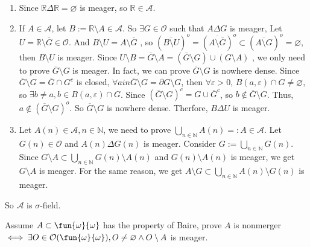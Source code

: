 \documentclass{ctexart}
\begin{document}
\begin{solution}
  \begin{enumerate}
    \item Since \(\mathbb{R} \Delta \mathbb{R} = \varnothing\) is meager, so \(\mathbb{R} \in \mathcal{A}\). 
    \item  If \(A \in \mathcal{A}\), let \(B:=\mathbb{R} \setminus A \in \mathcal{A}\). 
      So \( \exists G \in \mathcal{O}\) such that \( A \Delta G\) is meager,  
      Let \(U=\mathbb{R} \setminus \overline{G} \in \mathcal{O}\). And \(B \setminus U = A \setminus \overline{G}\)
      , so \((\overline{B \setminus U })^o = (\overline{A \setminus \overline{G}})^o  \subset (\overline{A \setminus G})^
      o = \varnothing\), then \(B \setminus U\) is meager. 
      Since \(U \setminus B = \overline{ G}\setminus A = (\overline{G} \setminus G) \cup (G \setminus A)\)
      , we only need to prove \(\overline{G}\setminus G\) is meager. 
      In fact, we can prove \(\overline{G}\setminus G\) is nowhere dense. 
      Since \(\overline{G} \setminus G = \overline{G} \cap G^c \) is closed,
       \(\forall a in \overline{G} \setminus G = \partial G \setminus G\), then \(\forall \varepsilon > 0\),
     \(B(a,\varepsilon) \cap G \neq \varnothing\), so \(\exists b \neq a, b \in B(a, \varepsilon) \cap G \).
     Since \((\overline{G} \setminus G)^c = G \cup \overline{G}^c\), so \(b \notin \overline{G} \setminus G\).
     Thus, \(a \notin (\overline{G} \setminus G)^o\).
     So \(\overline{G} \setminus G\) is nowhere dense. Therfore, \(B \Delta U\) is meager. 
    \item Let \(A(n) \in \mathcal{A}, n \in \mathbb{N}\), we need to prove \(\bigcup_{n \in \mathbb{N}} A(n)=:A \in \mathcal{A}\). 
     Let \(G(n) \in \mathcal{O}\) and \(A(n) \Delta G(n)\) is meager. Consider \(G:= \bigcup_{ n \in \mathbb{N}} G(n)\). 
     Since \(G \setminus A \subset \bigcup_{n \in \mathbb{N}} G(n) \setminus A(n)\) and \(G(n)\setminus A(n)\) is meager, we get \(G \setminus A\) is meager. 
     For the same reason, we get \(A \setminus G \subset \bigcup_{n \in \mathbb{N}} A(n)\setminus G(n)\) is meager. 

  \end{enumerate}
  So \(\mathcal{A}\) is \(\sigma\)-field. 
\end{solution}

\begin{problem}
  Assume \(A \subset \fun{\omega}{\omega}\) has the property of Baire, prove \(A\) is nonmerger \(\iff \exists O \in \mathcal{O}(\fun{\omega}{\omega}),O \neq \varnothing \wedge O\setminus A\) is meager. 
\end{problem}
\end{document}
